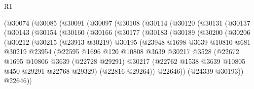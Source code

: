 \begin{lexlean}{R1}
\begin{coremodule}
      (@30074
        (@30085
          (@30091
            (@30097
              (@30108
                (@30114
                  (@30120
                    (@30131
                      (@30137
                        (@30143
                          (@30154
                            (@30160
                              (@30166
                                (@30177
                                  (@30183
                                    (@30189
                                      (@30200
                                        (@30206
                                          (@30212
                                            (@30215
                                              (@23913 @30219)
                                              @30195
                                              (@23948
                                                @1698
                                                @3639
                                                @10810
                                                @681
                                                @30219
                                                @23954
                                                (@22595
                                                  @1696
                                                  @120
                                                  @10808
                                                  @3639
                                                  @30217
                                                  @3528
                                                  (@22672
                                                    @1695
                                                    @10806
                                                    @3639
                                                    (@22728 @29291)
                                                    @30217
                                                    (@22762
                                                      @1538
                                                      @3639
                                                      @10805
                                                      @450
                                                      @29291
                                                      @22768
                                                      @29329)
                                                    (@22816 @29264))
                                                  @22646))
                                              (@24339 @30193))
                                            @22646))

\end{coremodule}
\end{lexlean}
